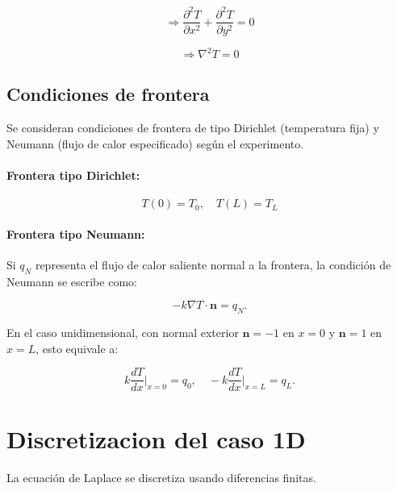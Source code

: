 \documentclass[11pt,a4paper]{article}
\begin{document}
\begin{equation}
\Rightarrow \frac{\partial^2T}{\partial x^2}+\frac{\partial^2T}{\partial y^2}=0
\end{equation}

\begin{equation}
\Rightarrow \nabla^2 T = 0
\end{equation}

\subsection{Condiciones de frontera}

Se consideran condiciones de frontera de tipo Dirichlet (temperatura fija) y 
Neumann (flujo de calor especificado) seg\'un el experimento.

\medskip

\paragraph{Frontera tipo Dirichlet:}

\begin{equation}
T(0)=T_0, \quad T(L)=T_L
\end{equation}

\paragraph{Frontera tipo Neumann:}

Si $q_N$ representa el flujo de calor saliente normal a la frontera, la
condici\'on de Neumann se escribe como:

\begin{equation}
-k\nabla T \cdot \mathbf{n} = q_N.
\end{equation}

En el caso unidimensional, con normal exterior $\mathbf{n}=-1$ en $x=0$ y
$\mathbf{n}=1$ en $x=L$, esto equivale a:

\begin{equation}
k\frac{dT}{dx}\bigg|_{x=0} = q_0, \quad
-k\frac{dT}{dx}\bigg|_{x=L} = q_L.
\end{equation}

\section{Discretizacion del caso 1D}

La ecuaci\'on de Laplace se discretiza usando diferencias finitas.
\end{document}
